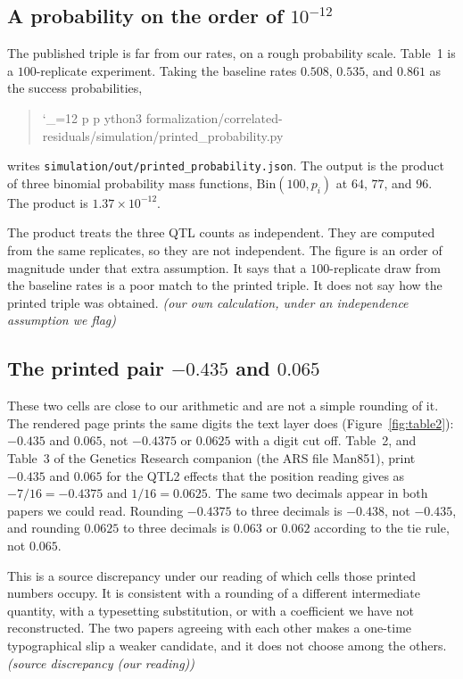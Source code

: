 \documentclass[11pt]{article}
\makeatletter
\newcommand{\sha}{\begingroup\catcode`\_=12 \sha@read}
\newcommand{\sha@read}[1]{\ttfamily\sha@loop#1\relax\endgroup}
\def\sha@loop#1{%
  \ifx\relax#1\else
    #1\allowbreak
    \expandafter\sha@loop
  \fi}
\newcommand{\ev}[1]{\textup{\emph{(#1)}}}
\makeatother
\begin{document}
\subsection{A probability on the order of \(10^{-12}\)}

The published triple is far from our rates, on a rough probability scale.
Table~1 is a $100$-replicate experiment. Taking the baseline rates
$0.508$, $0.535$, and $0.861$ as the success probabilities,
\begin{quote}\noindent
\sha{python3 formalization/correlated-residuals/simulation/printed_probability.py}
\end{quote}
writes \texttt{simulation/out/printed\_probability.json}. The output is the
product of three binomial probability mass functions,
$\mathrm{Bin}(100, p_i)$ at $64$, $77$, and $96$. The product is
$1.37\times 10^{-12}$.

The product treats the three QTL counts as independent. They are computed
from the same replicates, so they are not independent. The figure is an
order of magnitude under that extra assumption. It says that a
$100$-replicate draw from the baseline rates is a poor match to the printed
triple. It does not say how the printed triple was obtained.
\ev{our own calculation, under an independence assumption we flag}

\subsection{The printed pair \(-0.435\) and \(0.065\)}
\label{sec:rounding}

These two cells are close to our arithmetic and are not a simple rounding
of it. The rendered page prints the same digits the text layer does
(Figure~\ref{fig:table2}): $-0.435$ and $0.065$, not $-0.4375$ or $0.0625$
with a digit cut off. Table~2, and Table~3 of the Genetics Research
companion (the ARS file Man851), print $-0.435$ and $0.065$ for the QTL2
effects that the position reading gives as $-7/16=-0.4375$ and
$1/16=0.0625$. The same two
decimals appear in both papers we could read. Rounding $-0.4375$ to three
decimals is $-0.438$, not $-0.435$, and rounding $0.0625$ to three decimals
is $0.063$ or $0.062$ according to the tie rule, not $0.065$.

This is a source discrepancy under our reading of which cells those printed
numbers occupy. It is consistent with a rounding of a different intermediate
quantity, with a typesetting substitution, or with a coefficient we have not
reconstructed. The two papers agreeing with each other makes a one-time
typographical slip a weaker candidate, and it does not choose among the
others. \ev{source discrepancy (our reading)}
\end{document}
